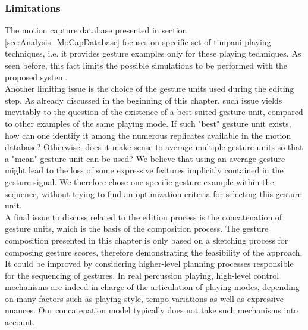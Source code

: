 			\subsubsection{Limitations}

The motion capture database presented in section \ref{sec:Analysis_MoCapDatabase} focuses on specific set of timpani playing techniques, i.e. it provides gesture examples only for these playing techniques. As seen before, this fact limits the possible simulations to be performed with the proposed system.\\

Another limiting issue is the choice of the gesture units used during the editing step. As already discussed in the beginning of this chapter, such issue yields inevitably to the question of the existence of a best-suited gesture unit, compared to other examples of the same playing mode. If such "best" gesture unit exists, how can one identify it among the numerous replicates available in the motion database? Otherwise, does it make sense to average multiple gesture units so that a "mean" gesture unit can be used? We believe that using an average gesture might lead to the loss of some expressive features implicitly contained in the gesture signal. We therefore chose one specific gesture example within the sequence, without trying to find an optimization criteria for selecting this gesture unit.\\ %

A final issue to discuss related to the edition process is the concatenation of gesture units, which is the basis of the composition process. The gesture composition presented in this chapter is only based on a sketching process for composing gesture scores, therefore demonstrating the feasibility of the approach. It could be improved by considering higher-level planning processes responsible for the sequencing of gestures. In real percussion playing, high-level control mechanisms are indeed in charge of the articulation of playing modes, depending on many factors such as playing style, tempo variations as well as expressive nuances. Our concatenation model typically does not take such mechanisms into account.




